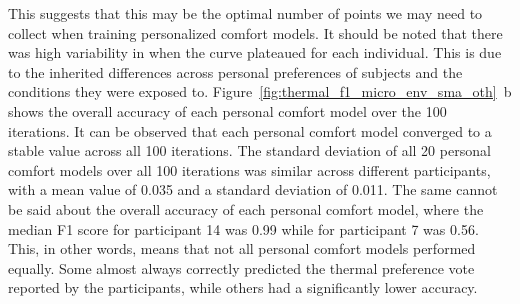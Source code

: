 This suggests that this may be the optimal number of points we may need to collect when training personalized comfort models.
It should be noted that there was high variability in when the curve plateaued for each individual.
This is due to the inherited differences across personal preferences of subjects and the conditions they were exposed to.
Figure~\ref{fig:thermal_f1_micro_env_sma_oth}~b shows the overall accuracy of each personal comfort model over the 100 iterations.
It can be observed that each personal comfort model converged to a stable value across all 100 iterations.
The standard deviation of all 20 personal comfort models over all 100 iterations was similar across different participants, with a mean value of 0.035 and a standard deviation of 0.011.
The same cannot be said about the overall accuracy of each personal comfort model, where the median F1 score for participant 14 was 0.99 while for participant 7 was 0.56.
This, in other words, means that not all personal comfort models performed equally.
Some almost always correctly predicted the thermal preference vote reported by the participants, while others had a significantly lower accuracy.

